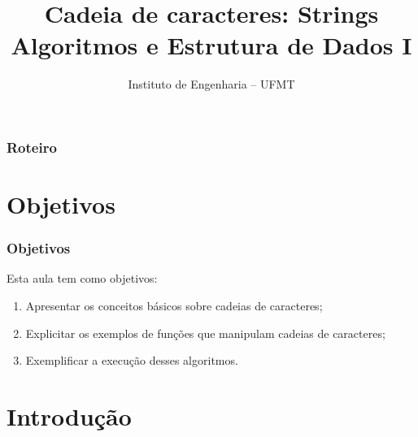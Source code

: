\documentclass[aspectratio=169]{beamer}
\title[Cadeia de caracteres: Strings]{Cadeia de caracteres: Strings\\
   Algoritmos e Estrutura de Dados I}
\author[IEng - UFMT]{Instituto de Engenharia -- UFMT}
\date{}
\begin{document}
\begin{frame}[plain]
  \titlepage
\end{frame}


\begin{frame}
\frametitle{Roteiro} %
\tableofcontents %
\end{frame}


\section{Objetivos}

\begin{frame}
\frametitle{Objetivos}
Esta aula tem como objetivos:

\begin{enumerate}
\item Apresentar os conceitos básicos sobre cadeias de caracteres;
\item Explicitar os exemplos de funções que manipulam cadeias de caracteres;
\item Exemplificar a execução desses algoritmos.
\end{enumerate}
\end{frame}


\section{Introdução} %
\end{document}
